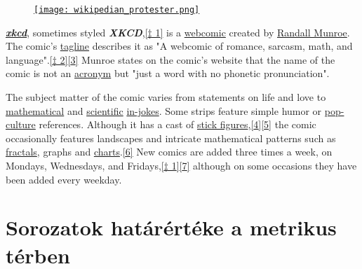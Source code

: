 \documentclass[12pt,a4paper]{scrartcl}
\newenvironment{ajanlofig}{\begin{figure}\begin{center}}{
\end{center}\end{figure}}
\begin{document}
\begin{ajanlo}

\begin{ajanlofig}

\href{https://xkcd.com}{\texttt{[image: wikipedian\_protester.png]}}

\end{ajanlofig}

\textbf{\emph{\href{https://xkcd.com/}{xkcd}}}, sometimes styled
\textbf{\emph{XKCD}},\href{https://en.wikipedia.org/wiki/Xkcd\#cite_note-aboutxkcd-3}{{[}‡
1{]}} is a \href{https://en.wikipedia.org/wiki/Webcomic}{webcomic}
created by \href{https://en.wikipedia.org/wiki/Randall_Munroe}{Randall
Munroe}. The comic's
\href{https://en.wikipedia.org/wiki/Tagline}{tagline} describes it as "A
webcomic of romance, sarcasm, math, and
language".\href{https://en.wikipedia.org/wiki/Xkcd\#cite_note-4}{{[}‡
2{]}}\href{https://en.wikipedia.org/wiki/Xkcd\#cite_note-Boston.com-5}{{[}3{]}}
Munroe states on the comic's website that the name of the comic is not
an \href{https://en.wikipedia.org/wiki/Acronym}{acronym} but "just a
word with no phonetic pronunciation".

The subject matter of the comic varies from statements on life and love
to \href{https://en.wikipedia.org/wiki/Mathematical_joke}{mathematical}
and \href{https://en.wikipedia.org/wiki/Science}{scientific}
\href{https://en.wikipedia.org/wiki/In-joke}{in-jokes}. Some strips
feature simple humor or
\href{https://en.wikipedia.org/wiki/Pop-culture}{pop-culture}
references. Although it has a cast of
\href{https://en.wikipedia.org/wiki/Stick_figures}{stick
figures},\href{https://en.wikipedia.org/wiki/Xkcd\#cite_note-Guzman-6}{{[}4{]}}\href{https://en.wikipedia.org/wiki/Xkcd\#cite_note-7}{{[}5{]}}
the comic occasionally features landscapes and intricate mathematical
patterns such as \href{https://en.wikipedia.org/wiki/Fractal}{fractals},
graphs and
\href{https://en.wikipedia.org/wiki/Chart}{charts}.\href{https://en.wikipedia.org/wiki/Xkcd\#cite_note-8}{{[}6{]}}
New comics are added three times a week, on Mondays, Wednesdays, and
Fridays,\href{https://en.wikipedia.org/wiki/Xkcd\#cite_note-aboutxkcd-3}{{[}‡
1{]}}\href{https://en.wikipedia.org/wiki/Xkcd\#cite_note-redhat-9}{{[}7{]}}
although on some occasions they have been added every weekday.

\end{ajanlo}

\hypertarget{sorozatok-hatarerteke-a-metrikus-terben}{%
\section{Sorozatok határértéke a metrikus
térben}\label{sorozatok-hatarerteke-a-metrikus-terben}}
\end{document}
